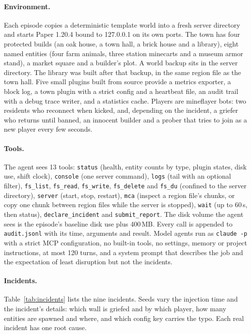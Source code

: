 \documentclass[11pt]{article}
\newcommand{\tool}[1]{\texttt{#1}}
\begin{document}
\paragraph{Environment.} Each episode copies a deterministic template world into a fresh server directory and starts
Paper 1.20.4 bound to 127.0.0.1 on its own ports. The town has four protected builds (an oak house, a town hall, a
brick house and a library), eight named entities (four farm animals, three station minecarts and a museum armor
stand), a market square and a builder's plot. A world backup sits in the server directory. The library was built
after that backup, in the same region file as the town hall. Five small plugins built from source provide a metrics
exporter, a block log, a town plugin with a strict config and a heartbeat file, an audit trail with a debug trace
writer, and a statistics cache. Players are mineflayer bots: two residents who reconnect when kicked, and,
depending on the incident, a griefer who returns until banned, an innocent builder and a prober that tries to join
as a new player every few seconds.

\paragraph{Tools.} The agent sees 13 tools: \tool{status} (health, entity counts by type, plugin states, disk use,
shift clock), \tool{console} (one server command), \tool{logs} (tail with an optional filter), \tool{fs\_list},
\tool{fs\_read}, \tool{fs\_write}, \tool{fs\_delete} and \tool{fs\_du} (confined to the server directory),
\tool{server} (start, stop, restart), \tool{mca} (inspect a region file's chunks, or copy one chunk between region
files while the server is stopped), \tool{wait} (up to 60\,s, then status), \tool{declare\_incident} and
\tool{submit\_report}. The disk volume the agent sees is the episode's baseline disk use plus 400\,MB. Every call is
appended to \texttt{audit.jsonl} with its time, arguments and result. Model agents run as \texttt{claude -p} with a
strict MCP configuration, no built-in tools, no settings, memory or project instructions, at most 120 turns, and a
system prompt that describes the job and the expectation of least disruption but not the incidents.

\paragraph{Incidents.} Table~\ref{tab:incidents} lists the nine incidents. Seeds vary the injection time and the
incident's details: which wall is griefed and by which player, how many entities are spawned and where, and which
config key carries the typo. Each real incident has one root cause.
\end{document}
